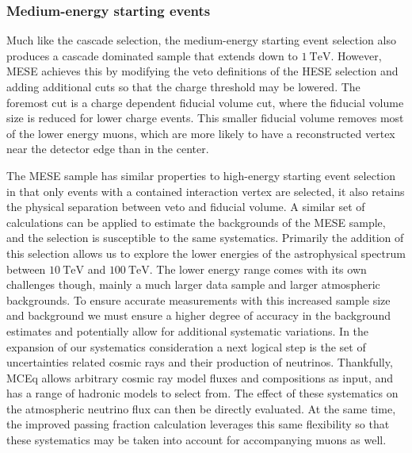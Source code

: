\subsubsection{Medium-energy starting events}
Much like the cascade selection, the medium-energy starting event selection also produces a cascade dominated sample that extends down to $\SI{1}\TeV$.
However, MESE achieves this by modifying the veto definitions of the HESE selection and adding additional cuts so that the charge threshold may be lowered.
The foremost cut is a charge dependent fiducial volume cut, where the fiducial volume size is reduced for lower charge events.
This smaller fiducial volume removes most of the lower energy muons, which are more likely to have a reconstructed vertex near the detector edge than in the center.

The MESE sample has similar properties to high-energy starting event selection in that only events with a contained interaction vertex are selected, it also retains the physical separation between veto and fiducial volume.
A similar set of calculations can be applied to estimate the backgrounds of the MESE sample, and the selection is susceptible to the same systematics.
Primarily the addition of this selection allows us to explore the lower energies of the astrophysical spectrum between $\SI{10}\TeV$ and $\SI{100}\TeV$.
The lower energy range comes with its own challenges though, mainly a much larger data sample and larger atmospheric backgrounds.
To ensure accurate measurements with this increased sample size and background we must ensure a higher degree of accuracy in the background estimates and potentially allow for additional systematic variations.
In the expansion of our systematics consideration a next logical step is the set of uncertainties related cosmic rays and their production of neutrinos.
Thankfully, MCEq allows arbitrary cosmic ray model fluxes and compositions as input, and has a range of hadronic models to select from. The effect of these systematics on the atmospheric neutrino flux can then be directly evaluated.
At the same time, the improved passing fraction calculation leverages this same flexibility so that these systematics may be taken into account for accompanying muons as well.

